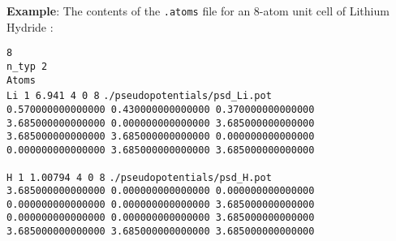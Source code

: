 \documentclass[12pt]{report}
\begin{document}
\noindent \textbf{Example}: The contents of the \texttt{.atoms} file for an $8$-atom unit cell of Lithium Hydride : \vspace{1.0mm}

\noindent
\texttt{8} \\
\texttt{n\_typ 2}\\

\noindent
\texttt{Atoms}\\
\texttt{Li 1 6.941 4 0 8}\newline
\texttt{./pseudopotentials/psd\_Li.pot}\\
\texttt{0.570000000000000   0.430000000000000   0.370000000000000}\newline
\texttt{3.685000000000000   0.000000000000000   3.685000000000000}\newline
\texttt{3.685000000000000   3.685000000000000   0.000000000000000}\newline
\texttt{0.000000000000000   3.685000000000000   3.685000000000000}\newline

\noindent  
\texttt{H 1 1.00794 4 0 8} \newline
\texttt{./pseudopotentials/psd\_H.pot}\\
\texttt{3.685000000000000   0.000000000000000   0.000000000000000}\newline
\texttt{0.000000000000000   0.000000000000000   3.685000000000000}\newline
\texttt{0.000000000000000   0.000000000000000   3.685000000000000}\newline
\texttt{3.685000000000000   3.685000000000000   3.685000000000000}\newline
   

\end{document}
